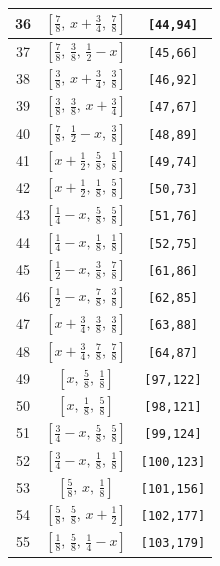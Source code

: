 \documentclass[fleqn,8pt]{jsarticle}
\begin{document}
\begin{longtable}{ccc}
36 & $\left[ \frac{7}{8},\, x + \frac{3}{4},\, \frac{7}{8} \right]$ & {\tt [44,94]} \\ \hline
37 & $\left[ \frac{7}{8},\, \frac{3}{8},\, \frac{1}{2} - x \right]$ & {\tt [45,66]} \\ \hline
38 & $\left[ \frac{3}{8},\, x + \frac{3}{4},\, \frac{3}{8} \right]$ & {\tt [46,92]} \\ \hline
39 & $\left[ \frac{3}{8},\, \frac{3}{8},\, x + \frac{3}{4} \right]$ & {\tt [47,67]} \\ \hline
40 & $\left[ \frac{7}{8},\, \frac{1}{2} - x,\, \frac{3}{8} \right]$ & {\tt [48,89]} \\ \hline
41 & $\left[ x + \frac{1}{2},\, \frac{5}{8},\, \frac{1}{8} \right]$ & {\tt [49,74]} \\ \hline
42 & $\left[ x + \frac{1}{2},\, \frac{1}{8},\, \frac{5}{8} \right]$ & {\tt [50,73]} \\ \hline
43 & $\left[ \frac{1}{4} - x,\, \frac{5}{8},\, \frac{5}{8} \right]$ & {\tt [51,76]} \\ \hline
44 & $\left[ \frac{1}{4} - x,\, \frac{1}{8},\, \frac{1}{8} \right]$ & {\tt [52,75]} \\ \hline
45 & $\left[ \frac{1}{2} - x,\, \frac{3}{8},\, \frac{7}{8} \right]$ & {\tt [61,86]} \\ \hline
46 & $\left[ \frac{1}{2} - x,\, \frac{7}{8},\, \frac{3}{8} \right]$ & {\tt [62,85]} \\ \hline
47 & $\left[ x + \frac{3}{4},\, \frac{3}{8},\, \frac{3}{8} \right]$ & {\tt [63,88]} \\ \hline
48 & $\left[ x + \frac{3}{4},\, \frac{7}{8},\, \frac{7}{8} \right]$ & {\tt [64,87]} \\ \hline
49 & $\left[ x,\, \frac{5}{8},\, \frac{1}{8} \right]$ & {\tt [97,122]} \\ \hline
50 & $\left[ x,\, \frac{1}{8},\, \frac{5}{8} \right]$ & {\tt [98,121]} \\ \hline
51 & $\left[ \frac{3}{4} - x,\, \frac{5}{8},\, \frac{5}{8} \right]$ & {\tt [99,124]} \\ \hline
52 & $\left[ \frac{3}{4} - x,\, \frac{1}{8},\, \frac{1}{8} \right]$ & {\tt [100,123]} \\ \hline
53 & $\left[ \frac{5}{8},\, x,\, \frac{1}{8} \right]$ & {\tt [101,156]} \\ \hline
54 & $\left[ \frac{5}{8},\, \frac{5}{8},\, x + \frac{1}{2} \right]$ & {\tt [102,177]} \\ \hline
55 & $\left[ \frac{1}{8},\, \frac{5}{8},\, \frac{1}{4} - x \right]$ & {\tt [103,179]} \\ \hline

\end{longtable}
\end{document}
